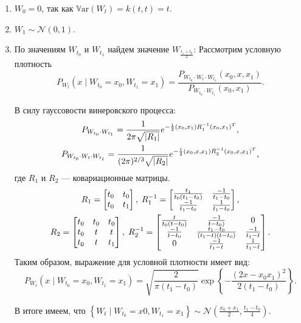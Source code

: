 \documentclass[11pt]{article}
\newcommand\abs[1]{\left\lvert#1\right\rvert}
\newcommand{\Var}[1]{\mathbb{V}\mathrm{ar}\left( #1 \right)}
\begin{document}
\begin{enumerate}
\item $W_0 = 0$, так как $\Var{W_t} = k(t, t) = t$.
\item $W_1 \sim \mathcal{N}(0, 1)$.
\item По значениям $W_{t_0}$ и $W_{t_1}$ найдем значение $W_{\frac{t_1+t_0}{2}}$:
Рассмотрим условную плотность
$$
P_{W_t}(x \mid W_{t_0} = x_0, W_{t_1} = x_1) = \frac{P_{W_{t_0} \cdot W_t \cdot W_{t_1}}(x_0, x, x_1)}{P_{W_{t_0} \cdot W_{t_1}}(x_0, x_1)}.
$$

В силу гауссовости винеровского процесса:
\begin{gather}
P_{W_{t_0} \cdot W_{t_1}} = \frac{1}{2\pi \sqrt{\abs{R_1}}} e^{-\frac{1}{2} (x_0, x_1) R_1^{-1} (x_0, x_1)^T}, \notag \\
P_{W_{t_0} \cdot W_t \cdot W_{t_1}} = \frac{1}{(2\pi)^{2/3} \sqrt{\abs{R_2}}} e^{-\frac{1}{2} (x_0, x, x_1) R_2^{-1} (x_0, x, x_1)^T}, \notag
\end{gather}
где $R_1$ и $R_2$ --- ковариационные матрицы.
\begin{gather}
R_1 =
\begin{bmatrix}
t_0 & t_0 \\
t_0 & t_1
\end{bmatrix}, \;
R_1^{-1} =
\begin{bmatrix}
\frac{t_1}{t_0(t_1-t_0)} & \frac{-1}{t_1-t_0} \\
\frac{-1}{t_1-t_0} & \frac{1}{t_1-t_0}
\end{bmatrix}, \notag \\
R_2 =
\begin{bmatrix}
t_0 & t_0 & t_0 \\
t_0 & t & t \\
t_0 & t & t_1
\end{bmatrix}, \;
R_2^{-1} =
\begin{bmatrix}
\frac{t}{t_0(t-t_0)} & \frac{-1}{t-t_0)} & 0 \\
\frac{-1}{t-t_0} & \frac{t_1-t_0}{(t_1-t)(t-t_0)} & \frac{-1}{t_1-t} \\
0 & \frac{-1}{t_1-t} & \frac{1}{t_1-t}
\end{bmatrix}. \notag
\end{gather}
Таким образом, выражение для условной плотности имеет вид:
$$
P_{W_t}(x \mid W_{t_0} = x_0, W_{t_1} = x_1) = \sqrt{\frac{2}{\pi(t_1-t_0)}} \exp \left\{ -\frac{(2x - x_0 x_1)^2}{2(t_1-t_0)} \right\}.
$$

В итоге имеем, что $\left\{ W_t \mid W_{t_0} = x0, W_{t_1} = x_1 \right\} \sim \mathcal{N}(\frac{x_0 + x_1}{2}, \frac{t_1 - t_0}{4})$.
\end{enumerate}	
\end{document}
